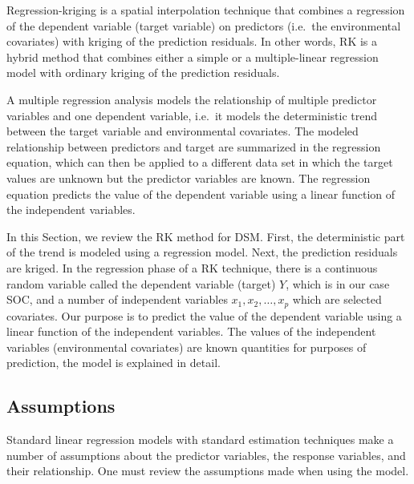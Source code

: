 \documentclass[10pt,b5paper,]{book}
\theoremstyle{definition}
\theoremstyle{definition}
\theoremstyle{definition}
\theoremstyle{remark}
\begin{document}
Regression-kriging is a spatial interpolation technique that combines a
regression of the dependent variable (target variable) on predictors
(i.e.~the environmental covariates) with kriging of the prediction
residuals. In other words, RK is a hybrid method that combines either a
simple or a multiple-linear regression model with ordinary kriging of
the prediction residuals.

A multiple regression analysis models the relationship of multiple
predictor variables and one dependent variable, i.e.~it models the
deterministic trend between the target variable and environmental
covariates. The modeled relationship between predictors and target are
summarized in the regression equation, which can then be applied to a
different data set in which the target values are unknown but the
predictor variables are known. The regression equation predicts the
value of the dependent variable using a linear function of the
independent variables.

In this Section, we review the RK method for DSM. First, the
deterministic part of the trend is modeled using a regression model.
Next, the prediction residuals are kriged. In the regression phase of a
RK technique, there is a continuous random variable called the dependent
variable (target) \(Y\), which is in our case SOC, and a number of
independent variables \({x_1, x_2,\dots,x_p}\) which are selected
covariates. Our purpose is to predict the value of the dependent
variable using a linear function of the independent variables. The
values of the independent variables (environmental covariates) are known
quantities for purposes of prediction, the model is explained in detail.

\hypertarget{assumptions}{%
\subsection{Assumptions}\label{assumptions}}

Standard linear regression models with standard estimation techniques
make a number of assumptions 
about the predictor variables, the response variables, and their
relationship. One must review the assumptions made when using the model.
\end{document}
